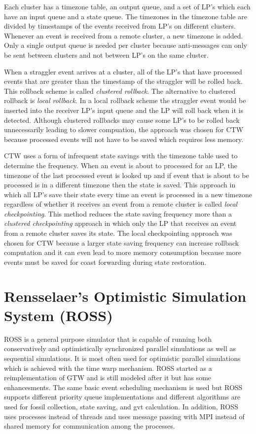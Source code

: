 \documentclass[11pt]{book}
\begin{document}
Each cluster has a timezone table, an output queue, and a set of LP's which each have an
input queue and a state queue. The timezones in the timezone table are divided by timestamps
of the events received from LP's on different clusters. Whenever an event is received from
a remote cluster, a new timezone is added. Only a single output queue is needed per cluster
because anti-messages can only be sent between clusters and not between LP's on the same
cluster.

When a straggler event arrives at a cluster, all of the LP's that have processed events that
are greater than the timestamp of the straggler will be rolled back. This rollback scheme is
called \emph{clustered rollback}. The alternative to clustered rollback is \emph{local
rollback}. In a local rollback scheme the straggler event would be inserted into the receiver
LP's input queue and the LP will roll back when it is detected. Although clustered rollbacks
may cause some LP's to be rolled back unnecessarily leading to slower compuation, the
approach was chosen for CTW because processed events will not have to be saved which
requires less memory.

CTW uses a form of infrequent state savings with the timezone table used to determine the
frequency. When an event is about to processed for an LP, the timezone of the last processed
event is looked up and if event that is about to be processed is in a different timezone then
the state is saved. This approach in which all LP's save their state every time an event is
processed in a new timezone regardless of whether it receives an event from a remote cluster
is called \emph{local checkpointing}. This method reduces the state saving frequency more
than a \emph{clustered checkpointing} approach in which only the LP that receives an event
from a remote cluster saves its state. The local checkpointing approach was chosen for CTW
because a larger state saving frequency can increase rollback computation and it can even
lead to more memory consumption because more events must be saved for coast forwarding
during state restoration.

\section{Rensselaer's Optimistic Simulation System (ROSS)}

ROSS\cite{carothers-00} is a general purpose simulator that is capable of running both
conservatively and optimistically synchronized parallel simulations as well as sequential
simulations. It is most often used for optimistic parallel simulations which is achieved
with the time warp mechanism. ROSS started as a reimplementation of GTW and is still
modeled after it but has some enhancesments. The same basic event scheduling mechanism is
used but ROSS supports different priority queue implementations and different algorithms
are used for fossil collection, state saving, and gvt calculation. In addition, ROSS uses
processes instead of threads and uses message passing with MPI instead of shared memory
for communication among the processes.
\end{document}
